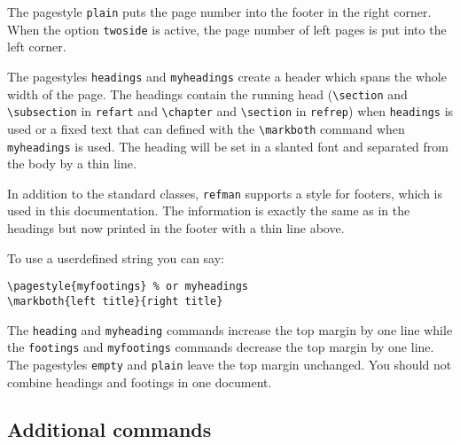 The pagestyle \texttt{plain} puts the page number into the footer in 
the right corner. When the option \texttt{twoside} is active, the page 
number of left pages is put into the left corner.

The pagestyles \texttt{headings} and \texttt{myheadings} create a 
header which spans the whole width of the page. The headings contain 
the running head (\verb|\section| and \verb|\subsection| in 
\texttt{refart} and \verb|\chapter| and \verb|\section| in 
\texttt{refrep}) when \texttt{headings} is used or a fixed text that can 
defined  with the \texttt{\textbackslash markboth} command when 
\texttt{myheadings} is used. The heading will be set in a slanted 
font and separated from the body by a thin line.

In addition to the standard classes, \texttt{refman} supports a style 
for footers, which is used in this documentation. The information is 
exactly the same as in the headings but now printed in the footer with 
a thin line above.

To use a userdefined string you can say:
\begin{verbatim}
\pagestyle{myfootings} % or myheadings
\markboth{left title}{right title}
\end{verbatim}

The \texttt{heading} and \texttt{myheading} commands increase the top 
margin by one line while the \texttt{footings} and 
\texttt{myfootings} commands decrease the top margin by one line.
The pagestyles \texttt{empty} and \texttt{plain} leave the top margin 
unchanged. You should not combine headings and footings in one document.

\subsection{Additional commands}

